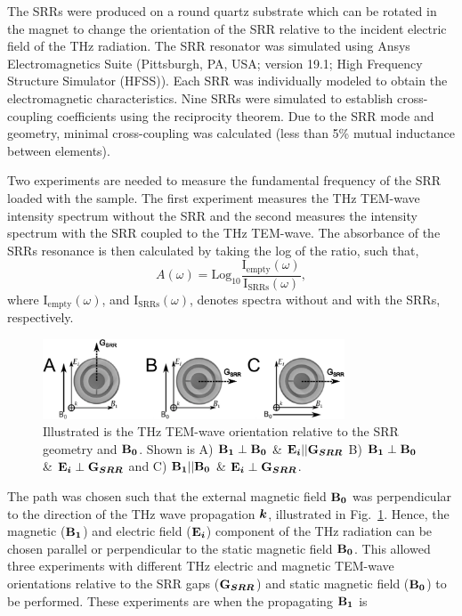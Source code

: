 The SRRs were produced on a round quartz substrate which can be rotated in the magnet to change the orientation of the SRR relative to the incident electric field of the THz radiation. The SRR resonator was simulated using Ansys Electromagnetics Suite (Pittsburgh, PA, USA; version 19.1; High Frequency Structure Simulator (HFSS)). Each SRR was individually modeled to obtain the electromagnetic characteristics. Nine SRRs were simulated to establish cross-coupling coefficients using the reciprocity theorem. Due to the SRR mode and geometry, minimal cross-coupling was calculated (less than 5\% mutual inductance between elements). 

Two experiments are needed to measure the fundamental frequency of the SRR loaded with the sample. The first experiment measures the THz TEM-wave intensity spectrum without the SRR and the second measures the intensity spectrum with the SRR coupled to the THz TEM-wave. The absorbance of the SRRs resonance is then calculated by taking the log of the ratio, such that,
\begin{equation}
  A(\omega) = \text{Log}_{10}\frac{\text{I}_{\text{empty}}(\omega)}{\text{I}_{\text{SRRs}}(\omega)},  
\end{equation}
where $\text{I}_{\text{empty}}(\omega)$, and $\text{I}_{\text{SRRs}}(\omega)$, denotes spectra without and with the SRRs, respectively. 


\begin{figure}[htp]
\centering
  \includegraphics[width=0.8\textwidth]{Kapitel/Ch4-Images/Ch4-BeamPath.eps}
  \caption[THz TEM-wave Orientation Relative to SRR]{Illustrated is the THz TEM-wave orientation relative to the SRR geometry and $\textbf{B}\boldsymbol{_{0}}$. Shown is A) $\textbf{B}\boldsymbol{_{1}} \perp \textbf{B}\boldsymbol{_{0}}$ \& $\textbf{E}\boldsymbol{_{i}}||\textbf{G}\boldsymbol{_{SRR}}$ B) $\textbf{B}\boldsymbol{_{1}} \perp \textbf{B}\boldsymbol{_{0}}$ \& $\textbf{E}\boldsymbol{_{i}}\perp\textbf{G}\boldsymbol{_{SRR}}$ and C) $\textbf{B}\boldsymbol{_{1}} || \textbf{B}\boldsymbol{_{0}}$ \& $\textbf{E}\boldsymbol{_{i}}\perp\textbf{G}\boldsymbol{_{SRR}}$.}
  \label{ch4-fig:BeamGEO}
\end{figure}

The path was chosen such that the external magnetic field $\textbf{B}\boldsymbol{_{0}}$ was perpendicular to the direction of the THz wave propagation $\boldsymbol{k}$, illustrated in Fig.~\ref{ch4-fig:BeamGEO}. Hence, the magnetic ($\textbf{B}\boldsymbol{_{1}}$) and electric field ($\textbf{E}\boldsymbol{_{i}}$) component of the THz radiation can be chosen parallel or perpendicular to the static magnetic field $\textbf{B}\boldsymbol{_{0}}$. This allowed three experiments with different THz electric and magnetic TEM-wave orientations relative to the SRR gaps ($\textbf{G}\boldsymbol{_{SRR}}$) and static magnetic field ($\textbf{B}\boldsymbol{_{0}}$) to be performed. These experiments are when the propagating $\textbf{B}\boldsymbol{_{1}}$ is 

